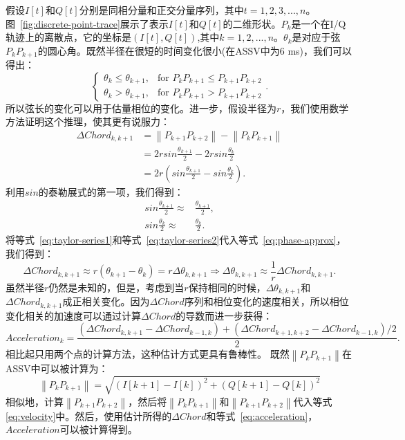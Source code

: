假设$I[t]$和$Q[t]$分别是同相分量和正交分量序列，其中$t=1,2,3,...,n$。图~\ref{fig:discrete-point-trace}展示了表示$I[t]$和$Q[t]$的二维形状。$P_k$是一个在I/Q轨迹上的离散点，它的坐标是$(I[t],Q[t])$,其中$k=1,2,...,n$。$\theta_{k}$是对应于弦$P_{k}P_{k+1}$的圆心角。既然半径在很短的时间变化很小(在ASSV中为6 ms)，我们可以得出：
$$
\begin{cases} 
  \theta_{k} \leq \theta_{k+1}, & \text{for } P_{k}P_{k+1} \leq P_{k+1}P_{k+2}  \\
  \theta_{k} > \theta_{k+1},  & \text{for } P_{k}P_{k+1} > P_{k+1}P_{k+2}
\end{cases}
.
$$
所以弦长的变化可以用于估量相位的变化。进一步，假设半径为$r$，我们使用数学方法证明这个推理，使其更有说服力：
\begin{align}
\Delta Chord_{k,k+1} &= \left\|P_{k+1}P_{k+2}\right\| - \left\|P_{k}P_{k+1}\right\|  \\ \label{eq:phase-approx}
&= 2rsin\frac{\theta_{k+1}}{2} - 2rsin\frac{\theta_{k}}{2} \nonumber \\  
&= 2r\left(sin\frac{\theta_{k+1}}{2} - sin\frac{\theta_{k}}{2}\right)  
.
\end{align}
利用$sin$的泰勒展式的第一项，我们得到：
\begin{align}
   sin\frac{\theta_{k+1}}{2} \approx & \frac{\theta_{k+1}}{2} ,\label{eq:taylor-series1}\\ 
    sin\frac{\theta_{k}}{2} \approx & \frac{\theta_{k}}{2}. \label{eq:taylor-series2}
\end{align}
将等式~\eqref{eq:taylor-series1}和等式~\eqref{eq:taylor-series2}代入等式~\eqref{eq:phase-approx}，我们得到：
\begin{equation}
 \Delta Chord_{k,k+1} \approx r(\theta_{k+1} - \theta_{k})=r\Delta \theta_{k,k+1} \Rightarrow \Delta \theta_{k,k+1} \approx \frac{1}{r}\Delta Chord_{k,k+1}.  \label{eq:velocity}
\end{equation}
虽然半径$r$仍然是未知的，但是，考虑到当$r$保持相同的时候，$\Delta \theta_{k,k+1}$和$\Delta Chord_{k,k+1}$成正相关变化。因为$\Delta Chord$序列和相位变化的速度相关，所以相位变化相关的加速度可以通过计算$\Delta Chord$的导数而进一步获得：
\begin{equation}
Acceleration_{k} = \frac{\left( \Delta Chord_{k,k+1} - \Delta Chord_{k-1,k} \right) + \left( \Delta Chord_{k+1,k+2}- \Delta Chord_{k-1,k}\right)/2}{2}. \label{eq:acceleration}
\end{equation}
相比起只用两个点的计算方法，这种估计方式更具有鲁棒性。
既然$\left\|P_{k}P_{k+1}\right\|$在ASSV中可以被计算为：
\begin{equation}
  \left\|P_{k}P_{k+1}\right\|= \sqrt{\left( I[k+1] - I[k] \right)^2 + \left( Q[k+1] - Q[k] \right)^2}
\end{equation}
相似地，计算$\left\|P_{k+1}P_{k+2}\right\|$，然后将$\left\|P_{k}P_{k+1}\right\|$和$\left\|P_{k+1}P_{k+2}\right\|$代入等式\eqref{eq:velocity}中。然后，使用估计所得的$\Delta Chord $和等式~\eqref{eq:acceleration}，$Acceleration$可以被计算得到。



